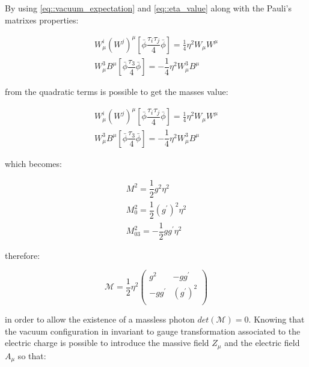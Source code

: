 By using  \autoref{eq::vacuum_expectation} and \autoref{eq::eta_value} along with the Pauli's matrixes properties:

\begin{equation}
\begin{array}{c}
 W_{\mu}^{i}(W^{j})^{\mu} \left[ \bar{\phi} \dfrac{\tau_{i}\tau_{j}}{4}\bar{\phi}\right] = \frac{1}{4}\eta^{2} W_{\mu}W^{\mu} \\

 W^{3}_{\mu} B^{\mu} \left[ \bar{\phi} \dfrac{\tau_{3}}{4} \bar{\phi} \right] = - \dfrac{1}{4} \eta^{2} W^{3}_{\mu}B^{\mu}
 \end{array}
\end{equation}

from the quadratic terms is possible to get the masses value:

\begin{equation}
\begin{array}{c}
W_{\mu}^{i}(W^{j})^{\mu} \left[ \bar{\phi} \dfrac{\tau_{i}\tau_{j}}{4}\bar{\phi}\right] = \frac{1}{4}\eta^{2} W_{\mu}W^{\mu} \\

W^{3}_{\mu} B^{\mu} \left[ \bar{\phi} \dfrac{\tau_{3}}{4} \bar{\phi} \right] = - \dfrac{1}{4} \eta^{2} W^{3}_{\mu}B^{\mu}
\end{array}
\end{equation}

which becomes:

\begin{equation}
\begin{array}{c}
M^{2}  = \dfrac{1}{2} g^{2} \eta^{2}\\
M_{0}^{2}  = \dfrac{1}{2} (g^{\prime})^{2} \eta^{2}\\
M_{03}^{2}  = -\dfrac{1}{2} gg^{\prime} \eta^{2}
\end{array}
\end{equation}

therefore:

\begin{equation}
\mathcal{M} =  \dfrac{1}{2} \eta^{2}
\begin{pmatrix}
 g^{2} & -gg^{\prime} \\
-gg^{\prime} & (g^{\prime})^{2} \\
\end{pmatrix}
\label{eq::matrix_mass}
\end{equation}

in order to allow the existence of a massless photon $det(\mathcal{M}) = 0$. Knowing that the vacuum configuration in invariant to gauge transformation associated to the electric charge is possible to introduce the massive field $Z_{\mu}$ and the electric field $A_{\mu}$ so that:

